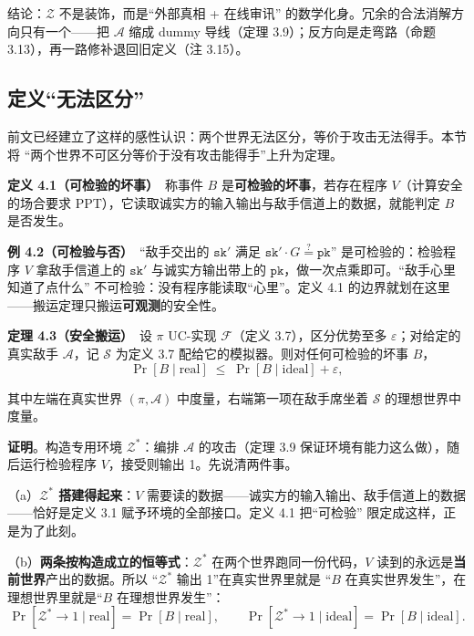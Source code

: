 结论：$\mathcal{Z}$ 不是装饰，而是“外部真相 + 在线审讯”
的数学化身。冗余的合法消解方向只有一个------把 $\mathcal{A}$ 缩成 dummy
导线（定理 3.9）；反方向是走弯路（命题 3.13），再一路修补退回旧定义（注
3.15）。

\subsection{定义“无法区分”}

前文已经建立了这样的感性认识：两个世界无法区分，等价于攻击无法得手。本节将
“两个世界不可区分等价于没有攻击能得手”上升为定理。

\textbf{定义
4.1（可检验的坏事）}　称事件 $B$ 是\textbf{可检验的坏事}，若存在程序 $V$（计算安全的场合要求
PPT），它读取诚实方的输入输出与敌手信道上的数据，就能判定 $B$ 是否发生。

\textbf{例
4.2（可检验与否）}　“敌手交出的 $\mathtt{sk}'$ 满足 $\mathtt{sk}' \cdot G \stackrel{?}{=} \mathtt{pk}$”
是可检验的：检验程序 $V$ 拿敌手信道上的 $\mathtt{sk}'$ 与诚实方输出带上的 $\mathtt{pk}$，做一次点乘即可。“敌手心里知道了点什么”
不可检验：没有程序能读取“心里”。定义 4.1
的边界就划在这里------搬运定理只搬运\textbf{可观测}的安全性。

\textbf{定理 4.3（安全搬运）}　设 $\pi$ UC-实现 $\mathcal{F}$（定义
3.7），区分优势至多 $\varepsilon$；对给定的真实敌手 $\mathcal{A}$，记 $\mathcal{S}$ 为定义
3.7 配给它的模拟器。则对任何可检验的坏事 $B$，
\begin{equation}\label{eq:uc-framework:4}
\Pr[B \mid \text{real}] \;\le\; \Pr[B \mid \text{ideal}] + \varepsilon,
\end{equation}

其中左端在真实世界 $(\pi, \mathcal{A})$ 中度量，右端第一项在敌手席坐着 $\mathcal{S}$ 的理想世界中度量。

\textbf{证明}。构造专用环境 $\mathcal{Z}^*$：编排 $\mathcal{A}$ 的攻击（定理
3.9 保证环境有能力这么做），随后运行检验程序 $V$，接受则输出
1。先说清两件事。

（a）\textbf{$\mathcal{Z}^*$ 搭建得起来}：$V$ 需要读的数据------诚实方的输入输出、敌手信道上的数据------恰好是定义
3.1 赋予环境的全部接口。定义 4.1 把“可检验”
限定成这样，正是为了此刻。

（b）\textbf{两条按构造成立的恒等式}：$\mathcal{Z}^*$ 在两个世界跑同一份代码，$V$ 读到的永远是\textbf{当前世界}产出的数据。所以
“$\mathcal{Z}^*$ 输出 1”在真实世界里就是
“$B$ 在真实世界发生”，在理想世界里就是“$B$ 在理想世界发生”：
\begin{equation}\label{eq:uc-framework:5}
\Pr[\mathcal{Z}^*\to 1 \mid \text{real}] = \Pr[B \mid \text{real}],
\qquad
\Pr[\mathcal{Z}^*\to 1 \mid \text{ideal}] = \Pr[B \mid \text{ideal}].
\end{equation}

